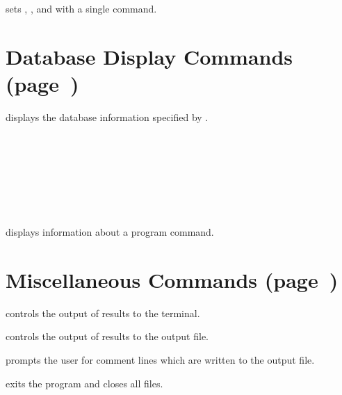  {
sets , , and  with a single command. 
}

\section{Database Display Commands (page~\protect\pageref{cmd:display})}

 {
displays the database information specified by .

\cenlinesbegin
{}\\
\\
\\
\\
\\
\\
\cenlinesend
}

 {
displays information about a program command.
}

\section{Miscellaneous Commands (page~\protect\pageref{sec:misc})}

 {
controls the output of results to the terminal.  
}

 {
controls the output of results to the output file.  
}

 {
prompts the user for  comment lines which are written to
the output file. 
}

 {
exits the program and closes all files.
}

